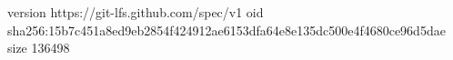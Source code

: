 version https://git-lfs.github.com/spec/v1
oid sha256:15b7c451a8ed9eb2854f424912ae6153dfa64e8e135dc500e4f4680ce96d5dae
size 136498
